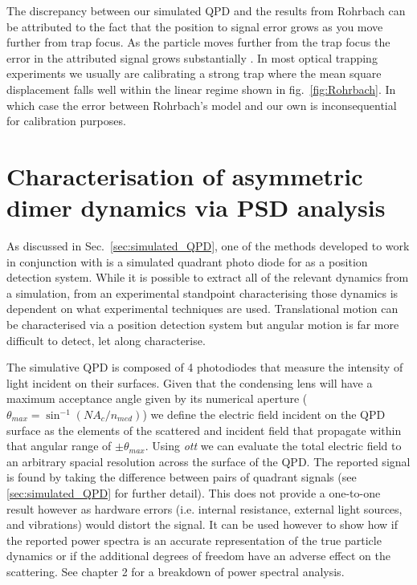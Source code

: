 The discrepancy between our simulated QPD and the results 
from Rohrbach can be attributed to the fact that the position 
to signal error grows as you move further from trap focus. 
As the particle moves further from the trap focus the error 
in the attributed signal grows substantially \cite{Rohrbach2002}.
In most optical trapping experiments we usually are calibrating 
a strong trap where the mean square displacement falls well within 
the linear regime shown in fig.~\ref{fig:Rohrbach}. In which case 
the error between Rohrbach's model and our own is inconsequential 
for calibration purposes. 

\section{Characterisation of asymmetric dimer dynamics via PSD analysis}
As discussed in Sec.~\ref{sec:simulated_QPD}, one of the methods 
developed to work in conjunction with \cite{Vigilante2020} 
is a simulated quadrant photo diode for as a position 
detection system. While it is possible to extract all of 
the relevant dynamics from a simulation, from an experimental
standpoint characterising those dynamics is dependent on what
experimental techniques are used. Translational motion can be
characterised via a position detection system but angular 
motion is far more difficult to detect, let along characterise. 

The simulative QPD is composed of 4 photodiodes that measure the 
intensity of light incident on their surfaces. Given that the 
condensing lens will have a maximum acceptance angle given by 
its numerical aperture ($\theta_{max} = \sin^{-1}\left(NA_c/n_
{med}\right)$) we define the electric field incident on the QPD 
surface as the elements of the scattered and incident field that 
propagate within that angular range of $\pm \theta_{max}$. Using 
\textit{ott} we can evaluate the total electric field to an 
arbitrary spacial resolution across the surface of the QPD. The 
reported signal is found by taking the difference between pairs 
of quadrant signals (see \ref{sec:simulated_QPD} for further 
detail). This does not provide a one-to-one result however as 
hardware errors (i.e. internal resistance, external light sources, 
and vibrations) would distort the signal. It can be used however to 
show how if the reported power spectra is an accurate representation 
of the true particle dynamics or if the additional degrees of freedom 
have an adverse effect on the scattering. See chapter 2 for a breakdown
of power spectral analysis. 

